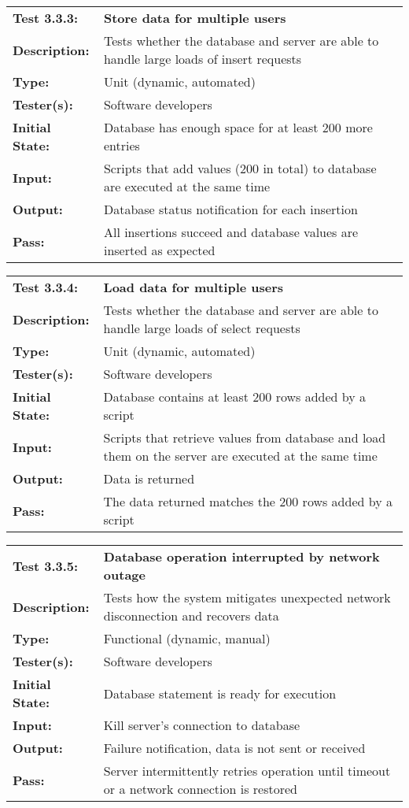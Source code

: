\documentclass{article}
\newenvironment{testcase}
    {
    \begin{center}
    \begin{mdframed}[
        userdefinedwidth=15.5cm,
        leftmargin=1cm,
        rightmargin=1cm
        ]
    \begin{tabular}{p{2.5cm} p{9cm}}
    }
    {
    \end{tabular}
    \end{mdframed}
    \end{center}
    }
\newcommand{\tctit}[2]{\textbf{#1} & \textbf{#2}}
\newcommand{\tcdesc}{\textbf{Description:}}
\newcommand{\tctype}{\textbf{Type:}}
\newcommand{\testers}{\textbf{Tester(s):}}
\newcommand{\tcinit}{\textbf{Initial State:}}
\newcommand{\tcin}{\textbf{Input:}}
\newcommand{\tcout}{\textbf{Output:}}
\newcommand{\tcpass}{\textbf{Pass:}}
\begin{document}
\begingroup
\begin{testcase}
\tctit{Test 3.3.3:}{Store data for multiple users} \\
    \tcdesc & Tests whether the database and server are able to handle large loads of insert requests\\
    \tctype & Unit (dynamic, automated) \\
    \testers & Software developers \\
    \tcinit & Database has enough space for at least 200 more entries \\
    \tcin & Scripts that add values (200 in total) to database are executed at the same time \\
    \tcout & Database status notification for each insertion \\
    \tcpass & All insertions succeed and database values are inserted as expected \\
\end{testcase}
\endgroup

\begingroup
\begin{testcase}
\tctit{Test 3.3.4:}{Load data for multiple users} \\
    \tcdesc & Tests whether the database and server are able to handle large loads of select requests\\
    \tctype & Unit (dynamic, automated) \\
    \testers & Software developers \\
    \tcinit & Database contains at least 200 rows added by a script\\
    \tcin & Scripts that retrieve values from database and load them on the server are executed at the same time \\
    \tcout & Data is returned \\
    \tcpass & The data returned matches the 200 rows added by a script \\
\end{testcase}
\endgroup

\begingroup
\begin{testcase}
\tctit{Test 3.3.5:}{Database operation interrupted by network outage} \\
\tcdesc & Tests how the system mitigates unexpected network disconnection and recovers data \\
\tctype & Functional (dynamic, manual) \\
\testers & Software developers \\
\tcinit & Database statement is ready for execution \\
\tcin & Kill server's connection to database \\
\tcout & Failure notification, data is not sent or received \\
\tcpass & Server intermittently retries operation until timeout or a network connection is restored \\
\end{testcase}
\endgroup
\end{document}
